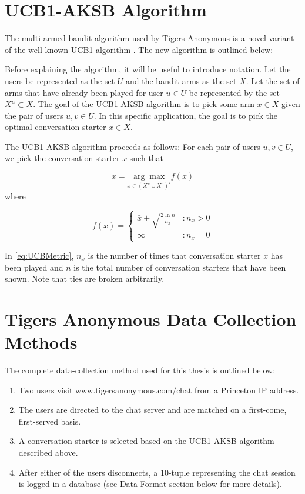 \section{UCB1-AKSB Algorithm}

The multi-armed bandit algorithm used by Tigers Anonymous is a novel variant of the well-known UCB1 algorithm \citep{auer02}. The new algorithm is outlined below:

Before explaining the algorithm, it will be useful to introduce notation. Let the users be represented as the set $U$ and the bandit arms as the set $X$. Let the set of arms that have already been played for user $u\in{U}$ be represented by the set $X^u \subset{X}$. The goal of the UCB1-AKSB algorithm is to pick some arm $x\in{X}$ given the pair of users $u,v \in{U}$. In this specific application, the goal is to pick the optimal conversation starter $x\in{X}$.

The UCB1-AKSB algorithm proceeds as follows: For each pair of users $u,v\in{U}$, we pick the conversation starter $x$ such that

\begin{equation}
\label{eq:UCBMain}
x = \underset{x \in{(X^u \cup X^v)}^{\mathsf{c}}}{\arg\max{}} f(x)
\end{equation}
where

\begin{equation}
\label{eq:UCBMetric}
   f(x) = \left\{
     \begin{array}{lr}
       \bar{x}+ \sqrt{\frac{2\ln{n}}{n_x}} & : n_x > 0\\
       \infty & : n_x = 0
     \end{array}
   \right.
\end{equation}

In \autoref{eq:UCBMetric}, $n_x$ is the number of times that conversation starter $x$ has been played and $n$ is the total number of conversation starters that have been shown. Note that ties are broken arbitrarily.

\section{Tigers Anonymous Data Collection Methods}

The complete data-collection method used for this thesis is outlined below: 

\begin{enumerate}
\item Two users visit www.tigersanonymous.com/chat from a Princeton IP address.
\item The users are directed to the chat server and are matched on a first-come, first-served basis.
\item A conversation starter is selected based on the UCB1-AKSB algorithm described above.
\item After either of the users disconnects, a 10-tuple representing the chat session is logged in a database (see Data Format section below for more details).
\end{enumerate}

